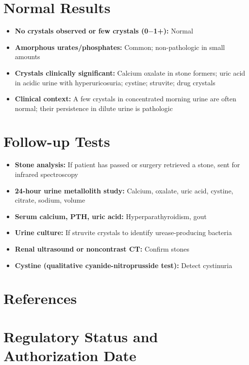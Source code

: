 \section*{Normal Results}
\begin{itemize}
  \item \textbf{No crystals observed or few crystals (0$-$1+):} Normal
  \item \textbf{Amorphous urates/phosphates:} Common; non-pathologic in small amounts
  \item \textbf{Crystals clinically significant:} Calcium oxalate in stone formers; uric acid in acidic urine with hyperuricosuria; cystine; struvite; drug crystals
  \item \textbf{Clinical context:} A few crystals in concentrated morning urine are often normal; their persistence in dilute urine is pathologic
\end{itemize}

\section*{Follow-up Tests}
\begin{itemize}
  \item \textbf{Stone analysis:} If patient has passed or surgery retrieved a stone, sent for infrared spectroscopy
  \item \textbf{24-hour urine metallolith study:} Calcium, oxalate, uric acid, cystine, citrate, sodium, volume
  \item \textbf{Serum calcium, PTH, uric acid:} Hyperparathyroidism, gout
  \item \textbf{Urine culture:} If struvite crystals to identify urease-producing bacteria
  \item \textbf{Renal ultrasound or noncontrast CT:} Confirm stones
  \item \textbf{Cystine (qualitative cyanide-nitroprusside test):} Detect cystinuria
\end{itemize}

\section*{References}



\clearpage
\section*{Regulatory Status and Authorization Date}

\clearpage
